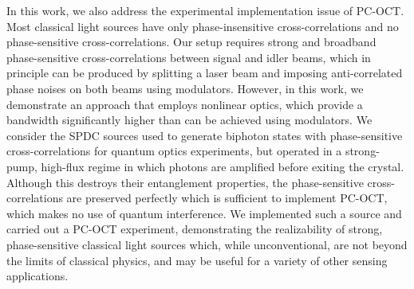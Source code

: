In this work, we also address the experimental implementation issue of PC-OCT. Most classical light sources have only phase-insensitive cross-correlations and no phase-sensitive cross-correlations. Our setup requires strong and broadband phase-sensitive cross-correlations between signal and idler beams, which in principle can be produced by splitting a laser beam and imposing anti-correlated phase noises on both beams using modulators. However, in this work, we demonstrate an approach that employs nonlinear optics, which provide a bandwidth significantly higher than can be achieved using modulators. We consider the SPDC sources used to generate biphoton states with phase-sensitive cross-correlations for quantum optics experiments, but operated in a strong-pump, high-flux regime in which photons are amplified before exiting the crystal. Although this destroys their entanglement properties, the phase-sensitive cross-correlations are preserved perfectly which is sufficient to implement PC-OCT, which makes no use of quantum interference. We implemented such a source and carried out a PC-OCT experiment, demonstrating the realizability of strong, phase-sensitive classical light sources which, while unconventional, are not beyond the limits of classical physics, and may be useful for a variety of other sensing applications.


